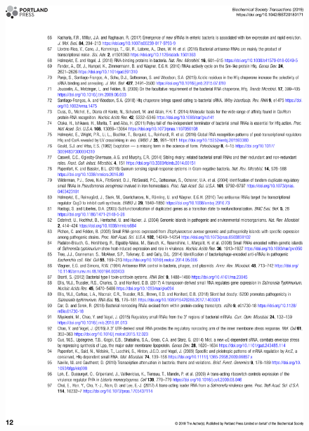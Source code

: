 \begin{figure}
    \centering
    \includegraphics[width=\linewidth]{lit_review/page12.png}
\end{figure}
